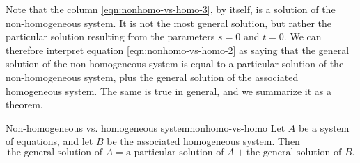Note that the column {\eqref{eqn:nonhomo-vs-homo-3}}, by itself, is a
solution of the non-homogeneous system. It is not the most general
solution, but rather the particular solution resulting from the
parameters $s=0$ and $t=0$. We can therefore interpret equation
{\eqref{eqn:nonhomo-vs-homo-2}} as saying that the general
solution of the non-homogeneous system is
equal to a particular solution of the
non-homogeneous system, plus the general solution of the associated
homogeneous system. The same is true in general, and we summarize it
as a theorem.

\begin{theorem}{Non-homogeneous vs. homogeneous system}{nonhomo-vs-homo}
  Let $A$ be a system of equations, and let $B$ be the associated
  homogeneous system. Then
  \begin{equation*}
    \mbox{the general solution of $A$}
    = \mbox{a particular solution of $A$}
    + \mbox{the general solution of $B$}.
  \end{equation*}
\end{theorem}
